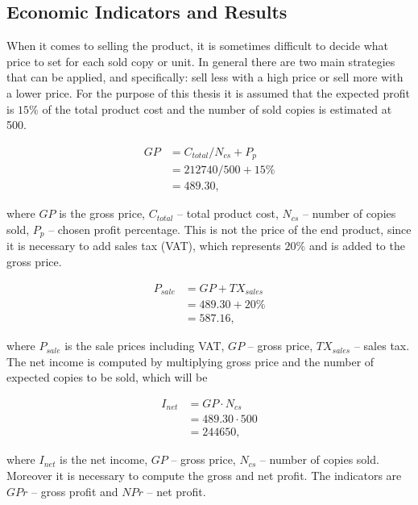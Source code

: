 \subsection{Economic Indicators and Results}

When it comes to selling the product, it is sometimes difficult to decide what
price to set for each sold copy or unit. In general there are two main
strategies that can be applied, and specifically: sell less with a high price
or sell more with a lower price. For the purpose of this thesis it is assumed
that the expected profit is $15\%$ of the total product cost and the number
of sold copies is estimated at 500.

\begin{equation}
\begin{split}
GP &= C_{total} / N_{cs} + P_{p}\\
    &= 212740/500 + 15\% \\
    &= 489.30,
\end{split}
\end{equation}

\noindent where $GP$ is the gross price, $C_{total}$ -- total product cost,
$N_{cs}$ -- number of copies sold, $P_{p}$ -- chosen profit percentage. This
is not the price of the end product, since it is necessary to add sales tax
(VAT), which represents $20\%$ and is added to the gross price.

\begin{equation}
\begin{split}
P_{sale} &= GP + TX_{sales}\\
            &= 489.30 + 20\% \\
            &= 587.16,
\end{split}
\end{equation}

\noindent where $P_{sale}$ is the sale prices including VAT, $GP$ -- gross
price, $TX_{sales}$ -- sales tax. The net income is computed by multiplying
gross price and the number of expected copies to be sold, which will be

\begin{equation}
\begin{split}
I_{net} &= GP \cdot N_{cs}\\
        &= 489.30 \cdot 500 \\
        &= 244650,
\end{split}
\end{equation}

\noindent where $I_{net}$ is the net income, $GP$ -- gross price, $N_{cs}$ --
number of copies sold. Moreover it is necessary to compute the gross and net
profit. The indicators are $GPr$ -- gross profit and $NPr$ -- net profit.

